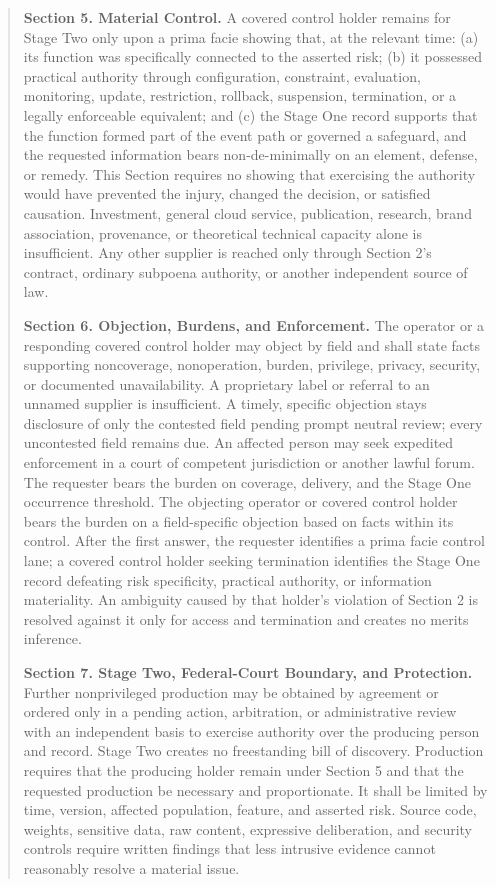 \begin{quote}
\textbf{Section 5. Material Control.} A covered control holder remains for Stage Two only upon a prima facie showing that, at the relevant time: (a) its function was specifically connected to the asserted risk; (b) it possessed practical authority through configuration, constraint, evaluation, monitoring, update, restriction, rollback, suspension, termination, or a legally enforceable equivalent; and (c) the Stage One record supports that the function formed part of the event path or governed a safeguard, and the requested information bears non-de-minimally on an element, defense, or remedy. This Section requires no showing that exercising the authority would have prevented the injury, changed the decision, or satisfied causation. Investment, general cloud service, publication, research, brand association, provenance, or theoretical technical capacity alone is insufficient. Any other supplier is reached only through Section 2's contract, ordinary subpoena authority, or another independent source of law.

\textbf{Section 6. Objection, Burdens, and Enforcement.} The operator or a responding covered control holder may object by field and shall state facts supporting noncoverage, nonoperation, burden, privilege, privacy, security, or documented unavailability. A proprietary label or referral to an unnamed supplier is insufficient. A timely, specific objection stays disclosure of only the contested field pending prompt neutral review; every uncontested field remains due. An affected person may seek expedited enforcement in a court of competent jurisdiction or another lawful forum. The requester bears the burden on coverage, delivery, and the Stage One occurrence threshold. The objecting operator or covered control holder bears the burden on a field-specific objection based on facts within its control. After the first answer, the requester identifies a prima facie control lane; a covered control holder seeking termination identifies the Stage One record defeating risk specificity, practical authority, or information materiality. An ambiguity caused by that holder's violation of Section 2 is resolved against it only for access and termination and creates no merits inference.

\textbf{Section 7. Stage Two, Federal-Court Boundary, and Protection.} Further nonprivileged production may be obtained by agreement or ordered only in a pending action, arbitration, or administrative review with an independent basis to exercise authority over the producing person and record. Stage Two creates no freestanding bill of discovery. Production requires that the producing holder remain under Section 5 and that the requested production be necessary and proportionate. It shall be limited by time, version, affected population, feature, and asserted risk. Source code, weights, sensitive data, raw content, expressive deliberation, and security controls require written findings that less intrusive evidence cannot reasonably resolve a material issue.


\end{quote}
